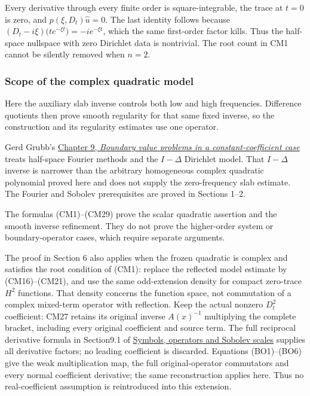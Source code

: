 \documentclass[
  11pt,
]{article}
\makeatletter
\let\ReaderOriginalAnchorStart\hyper@anchorstart
\let\ReaderOriginalAnchorEnd\hyper@anchorend
\let\ReaderPendingAliases\@empty
\def\ReaderArmAliases#1{\gdef\ReaderPendingAliases{#1}}
\def\hyper@anchorstart#1{\ReaderIfNativeAnchorTF{#1}{\ReaderPendingAliases\global\let\ReaderPendingAliases\@empty}{}\ReaderOriginalAnchorStart{#1}}
\makeatother
\begin{document}
Every derivative through every finite order is square-integrable, the
trace at \(t=0\) is zero, and \(p(\xi,D_t)\widehat u=0\). The last
identity follows because
\((D_t-i\xi)\bigl(t e^{-\xi t}\bigr)=-i e^{-\xi t}\), which the same
first-order factor kills. Thus the half-space nullspace with zero
Dirichlet data is nontrivial. The root count in CM1 cannot be silently
removed when \(n=2\).

\ReaderArmAliases{\ReaderOriginalAnchorStart{scope-antecedents-and-comparison-decision}\ReaderOriginalAnchorEnd\begingroup\expandafter\def\csname @currentHref\endcsname{scope-antecedents-and-comparison-decision}\label{scope-antecedents-and-comparison-decision}\endgroup\ReaderOriginalAnchorStart{scope-of-the-complex-quadratic-model}\ReaderOriginalAnchorEnd}
\subsubsection{Scope of the complex quadratic
model}\label{scope-of-the-complex-quadratic-model}

Here the auxiliary slab inverse controls both low and high frequencies.
Difference quotients then prove smooth regularity for that same fixed
inverse, so the construction and its regularity estimates use one
operator.

Gerd Grubb's \href{https://web.math.ku.dk/~grubb/dist9n.pdf}{Chapter 9,
\emph{Boundary value problems in a constant-coefficient case}} treats
half-space Fourier methods and the \(I-\Delta\) Dirichlet model. That
\(I-\Delta\) inverse is narrower than the arbitrary homogeneous complex
quadratic polynomial proved here and does not supply the zero-frequency
slab estimate. The Fourier and Sobolev prerequisites are proved in
Sections 1--2.

The formulas (CM1)--(CM29) prove the scalar quadratic assertion and the
smooth inverse refinement. They do not prove the higher-order system or
boundary-operator cases, which require separate arguments.

The proof in Section 6 also applies when the frozen quadratic is complex
and satisfies the root condition of (CM1): replace the reflected model
estimate by (CM16)--(CM21), and use the same odd-extension density for
compact zero-trace \(H^2\) functions. That density concerns the function
space, not commutation of a complex mixed-term operator with reflection.
Keep the actual nonzero \(D_t^2\) coefficient: CM27 retains its original
inverse \(A(x)^{-1}\) multiplying the complete bracket, including every
original coefficient and source term. The full reciprocal derivative
formula in Section9.1 of
\href{euclidean-symbol-calculus.pdf}{Symbols,
operators and Sobolev scales} supplies all derivative factors; no
leading coefficient is discarded. Equations (BO1)--(BO6) give the weak
multiplication map, the full original-operator commutators and every
normal coefficient derivative; the same reconstruction applies here.
Thus no real-coefficient assumption is reintroduced into this extension.
\end{document}
